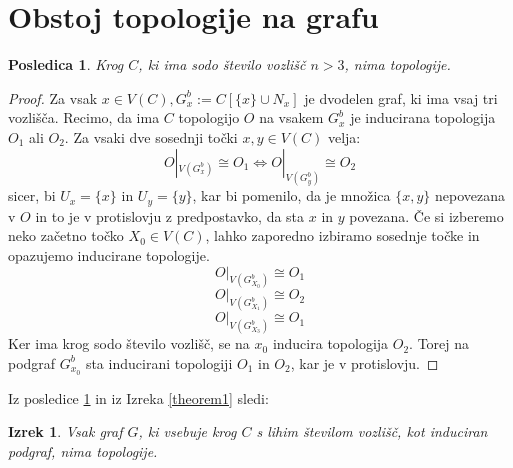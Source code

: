 \documentclass[a4paper, 12pt]{book}
\newtheorem{theorem}{Izrek}[section]
\newtheorem{corollary}{Posledica}[section]
\theoremstyle{definition}
\begin{document}
\section{Obstoj topologije na grafu}

\begin{corollary}\label{corollary1}
Krog $C$, ki ima sodo število vozlišč $n > 3$, nima topologije.
\end{corollary}
\begin{proof}
Za vsak $x \in V(C), G_x^b := C[\{x\} \cup N_x]$ je dvodelen graf, ki ima vsaj tri
vozlišča. Recimo, da ima $C$ topologijo $O$ na vsakem $G_x^b$ je inducirana 
topologija $O_1$ ali $O_2$. Za vsaki dve sosednji točki $x,y \in V(C)$ velja:
\[
    O|_{V(G_x^b)} \cong O_1 \iff O|_{V(G_y^b)} \cong O_2
\]
sicer, bi $U_x = \{x\}$ in $U_y = \{y\}$, kar bi pomenilo, da je množica
$\{x, y\}$ nepovezana v $O$ in to je v protislovju z predpostavko, da sta $x$ in
$y$ povezana. Če si izberemo neko začetno točko $X_0 \in V(C)$, lahko zaporedno
izbiramo sosednje točke in opazujemo inducirane topologije.
\[O|_{V(G_{X_0}^b)} \cong O_1\]
\[O|_{V(G_{X_1}^b)} \cong O_2\]
\[O|_{V(G_{X_3}^b)} \cong O_1\]
Ker ima krog sodo število vozlišč, se na $x_0$ inducira topologija $O_2$. Torej
na podgraf $G^b_{x_0}$ sta inducirani topologiji $O_1$ in $O_2$, kar je v protislovju.
\end{proof}

Iz posledice \ref*{corollary1} in iz Izreka \ref*{theorem1} sledi:
\begin{theorem}
Vsak graf $G$, ki vsebuje krog $C$ s lihim številom vozlišč, kot induciran podgraf,
nima topologije.
\end{theorem}

\cleardoublepage
{}


\end{document}
